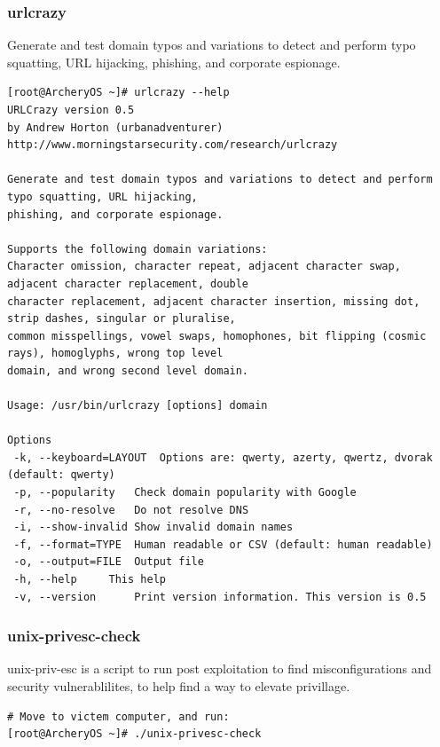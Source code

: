 \documentclass{article}
\begin{document}
\subsubsection{urlcrazy}
Generate and test domain typos and variations to detect and perform typo squatting, URL hijacking, phishing, and corporate espionage.
\begin{lstlisting}
[root@ArcheryOS ~]# urlcrazy --help
URLCrazy version 0.5
by Andrew Horton (urbanadventurer)
http://www.morningstarsecurity.com/research/urlcrazy

Generate and test domain typos and variations to detect and perform typo squatting, URL hijacking,
phishing, and corporate espionage.

Supports the following domain variations:
Character omission, character repeat, adjacent character swap, adjacent character replacement, double 
character replacement, adjacent character insertion, missing dot, strip dashes, singular or pluralise,
common misspellings, vowel swaps, homophones, bit flipping (cosmic rays), homoglyphs, wrong top level 
domain, and wrong second level domain.

Usage: /usr/bin/urlcrazy [options] domain

Options
 -k, --keyboard=LAYOUT	Options are: qwerty, azerty, qwertz, dvorak (default: qwerty)
 -p, --popularity	Check domain popularity with Google
 -r, --no-resolve	Do not resolve DNS
 -i, --show-invalid	Show invalid domain names
 -f, --format=TYPE	Human readable or CSV (default: human readable)
 -o, --output=FILE	Output file
 -h, --help		This help
 -v, --version   	Print version information. This version is 0.5
\end{lstlisting}

\subsubsection{unix-privesc-check}
unix-priv-esc is a script to run post exploitation to find misconfigurations and security vulnerablilites, to help find a way to elevate privillage.
\begin{lstlisting}
# Move to victem computer, and run:
[root@ArcheryOS ~]# ./unix-privesc-check
\end{lstlisting}
\end{document}
